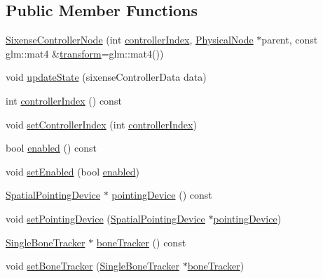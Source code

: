 \subsection*{Public Member Functions}
\begin{DoxyCompactItemize}
\item 
\hyperlink{classmotorcar_1_1SixenseControllerNode_acb326fa6a4174d767eedc5563cf8f3bb}{Sixense\-Controller\-Node} (int \hyperlink{classmotorcar_1_1SixenseControllerNode_aa061782ed3ae2a57180fdad9dc6383d9}{controller\-Index}, \hyperlink{classmotorcar_1_1PhysicalNode}{Physical\-Node} $\ast$parent, const glm\-::mat4 \&\hyperlink{classmotorcar_1_1SceneGraphNode_ad96e79fdd739ac8223a3128003be391a}{transform}=glm\-::mat4())
\item 
void \hyperlink{classmotorcar_1_1SixenseControllerNode_afbe76474cf77da7e11b0ac1b291b51f3}{update\-State} (sixense\-Controller\-Data data)
\item 
int \hyperlink{classmotorcar_1_1SixenseControllerNode_aa061782ed3ae2a57180fdad9dc6383d9}{controller\-Index} () const 
\item 
void \hyperlink{classmotorcar_1_1SixenseControllerNode_a337d87a6667b7e35301978c8017f2b20}{set\-Controller\-Index} (int \hyperlink{classmotorcar_1_1SixenseControllerNode_aa061782ed3ae2a57180fdad9dc6383d9}{controller\-Index})
\item 
bool \hyperlink{classmotorcar_1_1SixenseControllerNode_a46ff3af0aa1723d13a7f2a2be599a786}{enabled} () const 
\item 
void \hyperlink{classmotorcar_1_1SixenseControllerNode_aae977f21555500a932f2d9e7a670acd9}{set\-Enabled} (bool \hyperlink{classmotorcar_1_1SixenseControllerNode_a46ff3af0aa1723d13a7f2a2be599a786}{enabled})
\item 
\hyperlink{classmotorcar_1_1SpatialPointingDevice}{Spatial\-Pointing\-Device} $\ast$ \hyperlink{classmotorcar_1_1SixenseControllerNode_ad46bc47d07a912d24d27640f6cea28e4}{pointing\-Device} () const 
\item 
void \hyperlink{classmotorcar_1_1SixenseControllerNode_adab8248c0f5e4adb4a55afca1b096338}{set\-Pointing\-Device} (\hyperlink{classmotorcar_1_1SpatialPointingDevice}{Spatial\-Pointing\-Device} $\ast$\hyperlink{classmotorcar_1_1SixenseControllerNode_ad46bc47d07a912d24d27640f6cea28e4}{pointing\-Device})
\item 
\hyperlink{classmotorcar_1_1SingleBoneTracker}{Single\-Bone\-Tracker} $\ast$ \hyperlink{classmotorcar_1_1SixenseControllerNode_a96ebf0431751aad1153ac0da8845257d}{bone\-Tracker} () const 
\item 
void \hyperlink{classmotorcar_1_1SixenseControllerNode_a99cb44bf2c021c990b9f8bdc46f178f1}{set\-Bone\-Tracker} (\hyperlink{classmotorcar_1_1SingleBoneTracker}{Single\-Bone\-Tracker} $\ast$\hyperlink{classmotorcar_1_1SixenseControllerNode_a96ebf0431751aad1153ac0da8845257d}{bone\-Tracker})
\end{DoxyCompactItemize}
